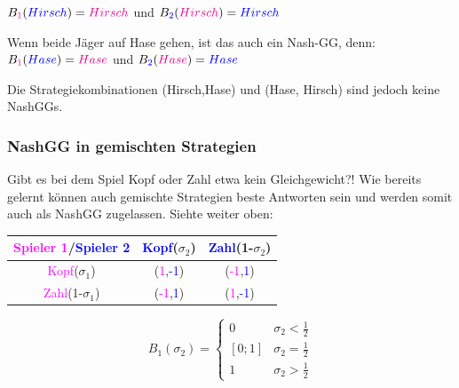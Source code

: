 \documentclass[11pt]{article}
\begin{document}
\(B_{\textcolor{magenta}{1}}(\textcolor{blue}{Hirsch}) = \textcolor{magenta}{Hirsch}\)
und
\(B_{\textcolor{blue}{2}}(\textcolor{magenta}{Hirsch}) = \textcolor{blue}{Hirsch}\)

Wenn beide Jäger auf Hase gehen, ist das auch ein Nash-GG, denn:
\(B_{\textcolor{magenta}{1}}(\textcolor{blue}{Hase}) = \textcolor{magenta}{Hase}\)
und
\(B_{\textcolor{blue}{2}}(\textcolor{magenta}{Hase}) = \textcolor{blue}{Hase}\)

Die Strategiekombinationen (Hirsch,Hase) und (Hase, Hirsch) sind jedoch keine NashGGs.

\subsubsection{NashGG in gemischten Strategien}
\label{sec:orgff72a1e}
Gibt es bei dem Spiel Kopf oder Zahl etwa kein Gleichgewicht?! Wie bereits gelernt können auch gemischte Strategien beste Antworten sein und werden somit auch als NashGG zugelassen.
Siehte weiter oben:
\begin{center}
\begin{tabular}{c|c|c}
\textcolor{magenta}{Spieler 1}/\textcolor{blue}{Spieler 2} & \textcolor{blue}{Kopf}(\(\sigma_{\text{2}}\)) & \textcolor{blue}{Zahl}(1-\(\sigma_{\text{2}}\))\\
\hline
\textcolor{magenta}{Kopf}(\(\sigma_{\text{1}}\)) & (\textcolor{magenta}{1},\textcolor{blue}{-1}) & (\textcolor{magenta}{-1},\textcolor{blue}{1})\\
\textcolor{magenta}{Zahl}(1-\(\sigma_{\text{1}}\)) & (\textcolor{magenta}{-1},\textcolor{blue}{1}) & (\textcolor{magenta}{1},\textcolor{blue}{-1})\\
\end{tabular}
\end{center}

\[ B_1(\sigma_2) =\begin{cases} 
      0 & \sigma_2 < \frac{1}{2} \\
      [0;1] & \sigma_2 = \frac{1}{2} \\
      1 & \sigma_2 > \frac{1}{2} 
   \end{cases}
\]
\end{document}
